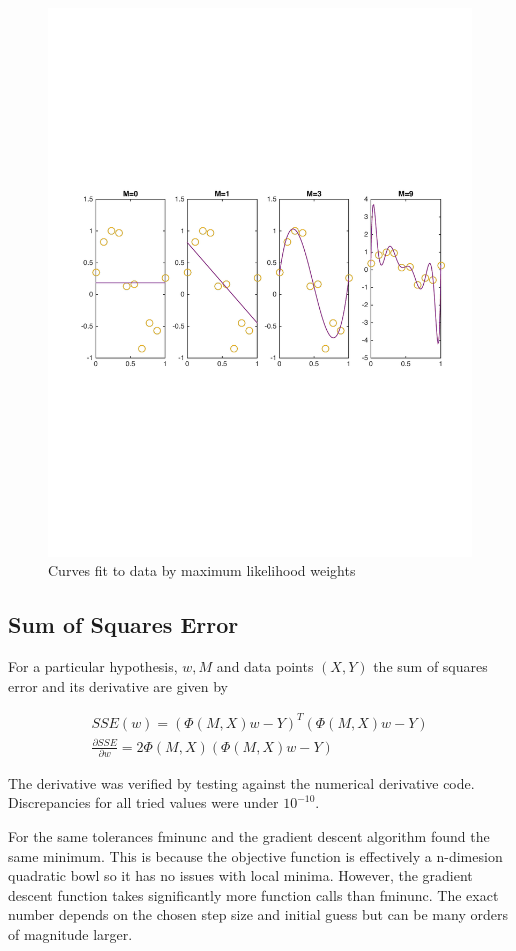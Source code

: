 \documentclass[10pt,twocolumn]{article}
\begin{document}
\begin{figure}[H]
\center
\includegraphics[scale =.45]{ML_weight.pdf}
\caption{Curves fit to data by maximum likelihood weights}
\end{figure}

\subsection*{ Sum of Squares Error}
For a particular hypothesis, $w, M $ and data points $(X, Y)$ the sum of squares error and its derivative are given by

\begin{align}
SSE(w) = (\Phi(M, X) w - Y)^T(\Phi(M, X) w - Y)\\
\frac{\partial SSE}{\partial w}= 2 \Phi(M,X)(\Phi(M,X)w -Y) 
\end{align}

The derivative was verified by testing against the numerical derivative code. Discrepancies for all tried values were under $10^{-10}$. 

For the same tolerances fminunc and the gradient descent algorithm found the same minimum. This is because the objective function is effectively a n-dimesion quadratic bowl so it has no issues with local minima. However, the gradient descent function takes significantly more function calls than fminunc. The exact number depends on the chosen step size and initial guess but can be many orders of magnitude larger. 
\end{document}
